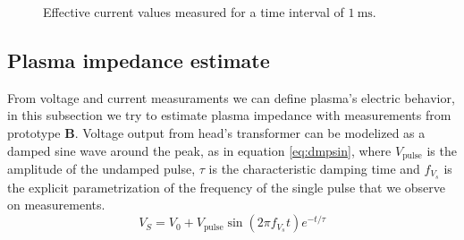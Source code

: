 \begin{figure}
 \centering
 \hfill
 \caption{Effective current values measured for a time interval of $\SI{1}{\milli\second}$.}
 \label{fig:ieff}
\end{figure}


\subsection{Plasma impedance estimate}
From voltage and current measuraments we can define plasma's electric behavior, in this subsection we try to estimate plasma impedance with measurements from prototype \textbf{B}. Voltage output from head's transformer can be modelized as a damped sine wave around the peak, as in equation \ref{eq:dmpsin}, where $V_{\text{pulse}}$ is the amplitude of the undamped pulse, $\tau$ is the characteristic damping time and $f_{V_{s}}$ is the explicit parametrization of the frequency of the single pulse that we observe on measurements.
\begin{equation}
 V_{S} = V_{0} + V_{\text{pulse}} \sin{(2 \pi f_{V_{s}} t)} e^{-t/\tau}
 \label{eq:dmpsin}
\end{equation}

